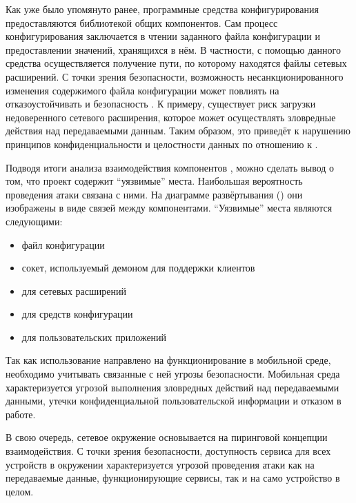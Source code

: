 %
Как уже было упомянуто ранее, программные средства конфигурирования  предоставляются библиотекой общих компонентов. 
%
Сам процесс конфигурирования заключается в чтении заданного файла конфигурации и предоставлении значений, хранящихся в нём. 
%
В частности, с помощью данного средства осуществляется получение пути, по которому находятся файлы сетевых расширений. 
%
С точки зрения безопасности, возможность несанкционированного изменения содержимого файла конфигурации может повлиять на отказоустойчивать и безопасность . 
%
К примеру, существует риск загрузки недоверенного сетевого расширения, которое может осуществлять зловредные действия над передаваемыми данным.
%
Таким образом, это приведёт к нарушению принципов конфиденциальности и целостности данных по отношению к . 

%
Подводя итоги анализа взаимодействия компонентов , можно сделать вывод о том, что проект содержит ``уязвимые'' места. Наибольшая вероятность проведения атаки связана с ними. На диаграмме развёртывания  () они изображены в виде связей между компонентами. ``Уязвимые'' места  являются следующими:
\begin{itemize}
	\setlength{\itemsep}{0pt}%

	\item файл конфигурации
	\item сокет, используемый демоном для поддержки клиентов
	\item {} для сетевых расширений
	\item {} для средств конфигурации
	\item {} для пользовательских приложений
\end{itemize}

%
Так как использование  направлено на функционирование в мобильной среде, необходимо учитывать связанные с ней угрозы безопасности. 
%
Мобильная среда характеризуется угрозой выполнения зловредных действий над передаваемыми данными, утечки конфиденциальной пользовательской информации и отказом  в работе. 

%
В свою очередь, сетевое окружение  основывается на пиринговой концепции взаимодействия. 
%
С точки зрения безопасности, доступность сервиса для всех устройств в окружении характеризуется угрозой проведения атаки как на передаваемые данные, функционирующие сервисы, так и на само устройство в целом. 

